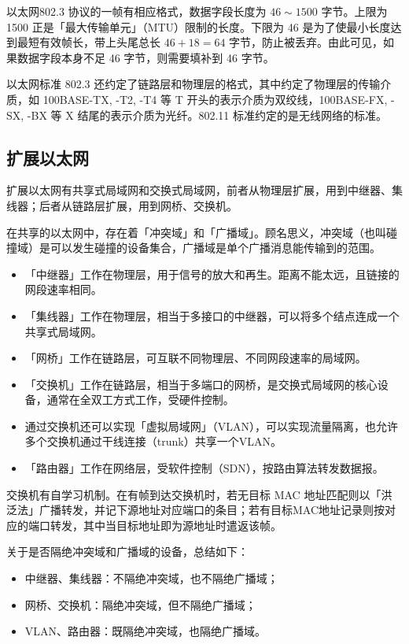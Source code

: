 \documentclass[UTF8]{ctexart}
\newcommand\Concept[1]{\textcolor{cyan!70!black}{#1}}
\begin{document}
以太网\Concept{802.3 协议}的一帧有相应格式，数据字段长度为 $46\sim 1500$ 字节。上限为 1500 正是「最大传输单元」（MTU）限制的长度。下限为 46 是为了使最小长度达到最短有效帧长，带上头尾总长 $46+18=64$ 字节，防止被丢弃。由此可见，如果数据字段本身不足 46 字节，则需要填补到 46 字节。

以太网标准 802.3 还约定了链路层和物理层的格式，其中约定了物理层的传输介质，如 100BASE-TX, -T2, -T4 等 T 开头的表示介质为双绞线，100BASE-FX, -SX, -BX 等 X 结尾的表示介质为光纤。802.11 标准约定的是无线网络的标准。

\subsection{扩展以太网}
扩展以太网有\Concept{共享式局域网}和\Concept{交换式局域网}，前者从物理层扩展，用到中继器、集线器；后者从链路层扩展，用到网桥、交换机。

在共享的以太网中，存在着\Concept{「冲突域」}和\Concept{「广播域」}。顾名思义，冲突域（也叫碰撞域）是可以发生碰撞的设备集合，广播域是单个广播消息能传输到的范围。

\begin{itemize}[itemsep=0pt,parsep=0pt]
  \item 「中继器」工作在物理层，用于信号的放大和再生。距离不能太远，且链接的网段速率相同。
  \item 「集线器」工作在物理层，相当于多接口的中继器，可以将多个结点连成一个共享式局域网。
  \item 「网桥」工作在链路层，可互联不同物理层、不同网段速率的局域网。
  \item 「交换机」工作在链路层，相当于多端口的网桥，是交换式局域网的核心设备，通常在全双工方式工作，受硬件控制。
  \item 通过交换机还可以实现「虚拟局域网」（VLAN），可以实现流量隔离，也允许多个交换机通过干线连接（trunk）共享一个VLAN。
  \item 「路由器」工作在网络层，受软件控制（SDN），按路由算法转发数据报。
\end{itemize}

交换机有自学习机制。在有帧到达交换机时，若无目标 MAC 地址匹配则以「洪泛法」广播转发，并记下源地址对应端口的条目；若有目标MAC地址记录则按对应的端口转发，其中当目标地址即为源地址时遣返该帧。

关于是否隔绝冲突域和广播域的设备，总结如下：
\begin{itemize}[itemsep=0pt,parsep=0pt]
  \item 中继器、集线器：不隔绝冲突域，也不隔绝广播域；
  \item 网桥、交换机：隔绝冲突域，但不隔绝广播域；
  \item VLAN、路由器：既隔绝冲突域，也隔绝广播域。
\end{itemize}
\end{document}

